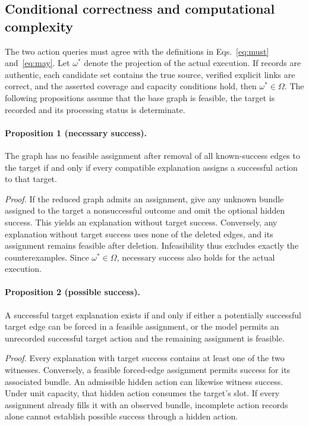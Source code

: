 \subsection{Conditional correctness and computational complexity}
\label{sec:correctness}

The two action queries must agree with the definitions in Eqs.~\eqref{eq:must} and~\eqref{eq:may}. Let $\omega^\ast$ denote the projection of the actual execution. If records are authentic, each candidate set contains the true source, verified explicit links are correct, and the asserted coverage and capacity conditions hold, then $\omega^\ast\in\Omega$. The following propositions assume that the base graph is feasible, the target is recorded and its processing status is determinate.

\paragraph{Proposition 1 (necessary success).}
The graph has no feasible assignment after removal of all known-success edges to the target if and only if every compatible explanation assigns a successful action to that target.

\emph{Proof.} If the reduced graph admits an assignment, give any unknown bundle assigned to the target a nonsuccessful outcome and omit the optional hidden success. This yields an explanation without target success. Conversely, any explanation without target success uses none of the deleted edges, and its assignment remains feasible after deletion. Infeasibility thus excludes exactly the counterexamples. Since $\omega^\ast\in\Omega$, necessary success also holds for the actual execution.

\paragraph{Proposition 2 (possible success).}
A successful target explanation exists if and only if either a potentially successful target edge can be forced in a feasible assignment, or the model permits an unrecorded successful target action and the remaining assignment is feasible.

\emph{Proof.} Every explanation with target success contains at least one of the two witnesses. Conversely, a feasible forced-edge assignment permits success for its associated bundle. An admissible hidden action can likewise witness success. Under unit capacity, that hidden action consumes the target's slot. If every assignment already fills it with an observed bundle, incomplete action records alone cannot establish possible success through a hidden action.


